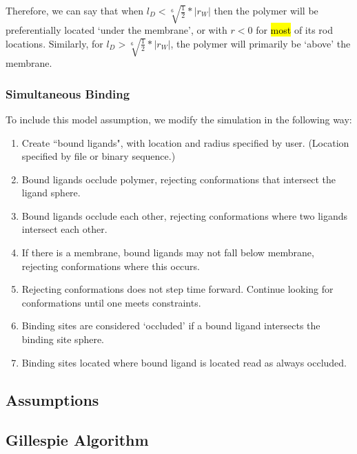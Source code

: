\documentclass[../AdvancementSummary.tex]{subfiles}
\begin{document}
Therefore, we can say that when $l_D < \sqrt[6]{\frac{1}{2}}*|r_W|$ then the polymer will be preferentially located `under the membrane', or with $r<0$ for \hl{most} of its rod locations. Similarly, for $l_D > \sqrt[6]{\frac{1}{2}}*|r_W|$, the polymer will primarily be `above' the membrane.



\subsubsection{Simultaneous Binding}

To include this model assumption, we modify the simulation in the following way:

\begin{enumerate}
\item Create ``bound ligands", with location and radius specified by user. (Location specified by file or binary sequence.)
\item Bound ligands occlude polymer, rejecting conformations that intersect the ligand sphere.
\item Bound ligands occlude each other, rejecting conformations where two ligands intersect each other.
\item If there is a membrane, bound ligands may not fall below membrane, rejecting conformations where this occurs.
\item Rejecting conformations does not step time forward.  Continue looking for conformations until one meets constraints.
\item Binding sites are considered `occluded' if a bound ligand intersects the binding site sphere.
\item Binding sites located where bound ligand is located read as always occluded.
\end{enumerate}



\subsection{Assumptions}
%

\subsection{Gillespie Algorithm}
\end{document}
